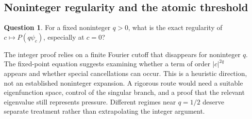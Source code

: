 \documentclass[11pt,a4paper]{article}
\numberwithin{equation}{section}
\theoremstyle{definition}
\newtheorem{question}[question]{Question}
\theoremstyle{remark}
\begin{document}
\subsection{Noninteger regularity and the atomic threshold}
\begin{question}
For a fixed noninteger $q>0$, what is the exact regularity of
$c\mapsto P(q\psi_c)$, especially at $c=0$?
\end{question}
The integer proof relies on a finite Fourier cutoff that disappears for
noninteger $q$. The fixed-point equation suggests examining whether a
term of order $|c|^{2q}$ appears and whether special cancellations can
occur. This is a heuristic direction, not an established noninteger
expansion. A rigorous route would need a suitable eigenfunction space,
control of the singular branch, and a proof that the relevant eigenvalue
still represents pressure. Different regimes near $q=1/2$ deserve
separate treatment rather than extrapolating the integer argument.
\end{document}

